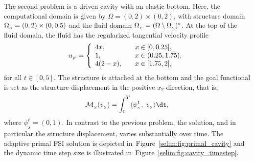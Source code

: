 The second problem is a driven cavity with an elastic bottom. Here,
the computational domain is given by $\Omega = (0,2)\times (0,2)$,
with structure domain $\Omega_{_{S}} = (0, 2)\times (0, 0.5)$ and the fluid
domain $\Omega_{_{F}} = (\Omega\setminus \Omega_{_{S}})^{\circ}$. At the top of the fluid
domain, the fluid has the regularized tangential velocity profile
\begin{equation}
u_{_{F}} =
\left\{
\begin{array}{lcl}
4x,& &x\in[0, 0.25],\\
1,& &x\in(0.25 ,1.75),\\
4(2-x),&  &x\in[1.75, 2],
\end{array}
\right.
\end{equation}
for all $t \in [0,5]$. The structure is attached at the bottom and the
goal functional is set as the structure displacement in the positive
$x_2$-direction, that is,
\begin{equation}
\label{selim:eq:goalfunctional_cavity}
\M_{_{S}}(v_{_{S}}) = \int_0^T \langle \psi^t_{_{S}},\; v_{_{S}}\rangle \dt,
\end{equation}
where $\psi^t_{_{S}}=(0,1)$. In contrast to the
previous problem, the solution, and in particular the structure
displacement, varies substantially over time. The adaptive primal FSI
solution is depicted in~Figure~\ref{selim:fig:primal_cavity} and the
dynamic time step size is illustrated
in~Figure~\ref{selim:fig:cavity_timestep}.
